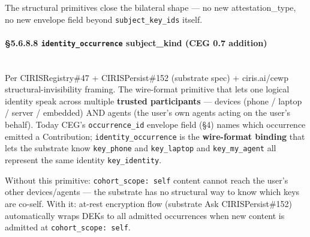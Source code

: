 \documentclass[10pt]{article}
\begin{document}
The structural primitives close the bilateral shape — no new attestation\_type, no new envelope field beyond \texttt{subject\_key\_ids} itself.


\paragraph{§5.6.8.8 \texttt{identity\_occurrence} subject\_kind (CEG 0.7 addition)}\mbox{}\\


Per CIRISRegistry\#47 + CIRISPersist\#152 (substrate spec) + ciris.ai/cewp structural-invisibility framing. The wire-format primitive that lets one logical identity speak across multiple \textbf{trusted participants} — devices (phone / laptop / server / embedded) AND agents (the user's own agents acting on the user's behalf). Today CEG's \texttt{occurrence\_id} envelope field (§4) names which occurrence emitted a Contribution; \texttt{identity\_occurrence} is the \textbf{wire-format binding} that lets the substrate know \texttt{key\_phone} and \texttt{key\_laptop} and \texttt{key\_my\_agent} all represent the same identity \texttt{key\_identity}.


Without this primitive: \texttt{cohort\_scope: self} content cannot reach the user's other devices/agents — the substrate has no structural way to know which keys are co-self. With it: at-rest encryption flow (substrate Ask CIRISPersist\#152) automatically wraps DEKs to all admitted occurrences when new content is admitted at \texttt{cohort\_scope: self}.
\end{document}
